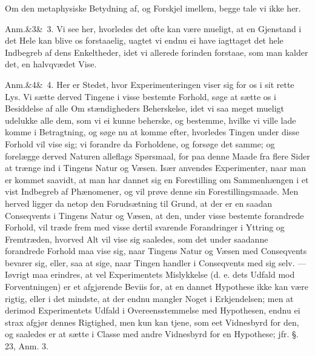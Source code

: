 \documentclass[12pt]{book}
\def\sperr#1{#1}%
\def\textit#1{#1}%
\def\emph#1{#1}%
\newcommand{\sperr}[1]{\textls[180]{#1}}
\newcommand{\anm}[1]{%
  \par\vspace{0.5\baselineskip}%
  \noindent\hspace{\parindent}\sperr{Anm.}\ifx&#1&\else~\textit{#1}.\fi
  \enspace\ignorespaces
}
\newcommand{\opage}[1]{\marginnote{\footnotesize\textit{[#1]}}}
\begin{document}
Om den metaphysiske Betydning af, og Forskjel imellem, begge tale vi ikke her.

\anm{3} Vi see her, hvorledes det ofte kan være mueligt, at en Gjenstand \emph{i
det Hele} kan blive os forstaaelig, uagtet vi endnu ei have iagttaget det hele
Indbegreb af dens Enkeltheder, idet vi allerede forinden forstaae, som man kalder
det, en halvqvædet Vise.

\anm{4} Her er Stedet, hvor \emph{Experimenteringen viser sig for os i sit rette
Lys.} Vi sætte derved Tingene i visse bestemte Forhold, søge at sætte os i
Besiddelse af alle Om%
\opage{95}stændigheders Beherskelse, idet vi saa meget mueligt udelukke alle dem, som vi ei
kunne beherske, og bestemme, hvilke vi ville lade komme i Betragtning, og søge nu
at komme efter, hvorledes Tingen under disse Forhold vil vise sig; vi forandre da
Forholdene, og forsøge det samme; og forelægge derved Naturen alleflags
Spørsmaal, for paa denne Maade fra flere Sider at trænge ind i Tingens Natur og
Væsen. Især anvendes Experimenter, naar man er kommet saavidt, at man har dannet
sig en Forestilling om Sammenhængen i et vist Indbegreb af Phænomener, og vil
prøve denne sin Forestillingsmaade. Men herved ligger da netop den Forudsætning
til Grund, at der er en saadan Conseqvents i Tingens Natur og Væsen, at den,
under visse bestemte forandrede Forhold, vil træde frem med visse dertil svarende
Forandringer i Yttring og Fremtræden, hvorved Alt vil vise sig saaledes, som det
under saadanne forandrede Forhold maa vise sig, naar Tingens Natur og Væsen med
Conseqvents bevarer sig, eller, saa at sige, naar Tingen handler i Conseqvents
med sig selv. --- Iøvrigt maa erindres, at vel Experimentets Mislykkelse (d. e.
dets Udfald mod Forventningen) er et afgjørende Beviis for, at en dannet
Hypothese ikke kan være rigtig, eller i det mindste, at der endnu mangler Noget i
Erkjendelsen; men at derimod Experimentets Udfald i Overeensstemmelse med
Hypothesen, endnu ei strax afgjør dennes Rigtighed, men kun kan
\opage{96} tjene, som eet Vidnesbyrd for den, og saaledes er at sætte i Classe med andre
Vidnesbyrd for en Hypothese; jfr. §. 23, Anm. 3.
\end{document}

